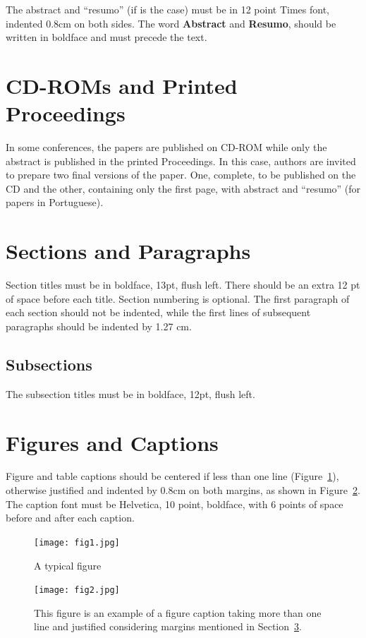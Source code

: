 \documentclass[12pt]{article}
\begin{document}
The abstract and ``resumo'' (if is the case) must be in 12 point Times font,
indented 0.8cm on both sides. The word \textbf{Abstract} and \textbf{Resumo},
should be written in boldface and must precede the text.

\newpage

\section{CD-ROMs and Printed Proceedings}

In some conferences, the papers are published on CD-ROM while only the
abstract is published in the printed Proceedings. In this case, authors are
invited to prepare two final versions of the paper. One, complete, to be
published on the CD and the other, containing only the first page, with
abstract and ``resumo'' (for papers in Portuguese).
\newpage
\section{Sections and Paragraphs}

Section titles must be in boldface, 13pt, flush left. There should be an extra
12 pt of space before each title. Section numbering is optional. The first
paragraph of each section should not be indented, while the first lines of
subsequent paragraphs should be indented by 1.27 cm.

\subsection{Subsections}

The subsection titles must be in boldface, 12pt, flush left.
\newpage
\section{Figures and Captions}\label{sec:figs}


Figure and table captions should be centered if less than one line
(Figure~\ref{fig:exampleFig1}), otherwise justified and indented by 0.8cm on
both margins, as shown in Figure~\ref{fig:exampleFig2}. The caption font must
be Helvetica, 10 point, boldface, with 6 points of space before and after each
caption.

\begin{figure}[H]
\centering
\texttt{[image: fig1.jpg]}
\caption{A typical figure}
\label{fig:exampleFig1}
\end{figure}

\begin{figure}[H]
\centering
\texttt{[image: fig2.jpg]}
\caption{This figure is an example of a figure caption taking more than one
  line and justified considering margins mentioned in Section~\ref{sec:figs}.}
\label{fig:exampleFig2}
\end{figure}
\end{document}
